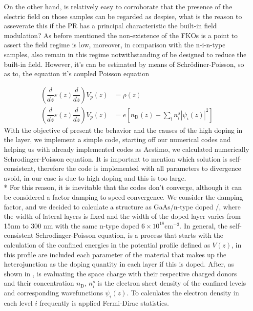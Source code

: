 On the other hand, is relatively easy to corroborate that the presence of the electric field on those samples can be regarded as despise, what is the reason to asseverate this if the PR has a principal characteristic the built-in field modulation?
As before mentioned the non-existence of the FKOs is a point to assert the field regime is low, moreover, in comparison with the n-i-n-type samples, also remain in this regime notwithstanding of be designed to reduce the built-in field. However, it's can be estimated by means of Schr\"odiner-Poisson, so as to, the equation  it's coupled Poisson equation\cite{jirauschek2014modeling,harrison2016chap3}

\begin{align}
	\left(\dfrac{d}{dz}\varepsilon(z)\dfrac{d}{dz}\right) V_{p}(z)&=\rho (z)
	\label{eq:chapter-3-poisson-equation-1}\\
	\left(\dfrac{d}{dz}\varepsilon(z)\dfrac{d}{dz}\right) V_{p}(z)&=e\left[n_{\mathrm{D}}(z)-\sum_{i}n_{i}^{s}\left|\psi_{i}(z)\right|^2\right]
	\label{eq:chapter-3-poisson-equation-2}
\end{align}
With the objective of present the behavior and the causes of the high doping in the \algaas layer, we implement a simple code, starting off our numerical codes and helping us with already implemented codes as Aestimo\cite{hebal2021general},  we calculated numerically Schrodinger-Poisson equation. It is important to mention which solution is self-consistent, therefore the code is implemented with all parameters to divergence avoid,  in our case is due to high doping and this is too large.\\*
For this reason, it is inevitable that the codes don't converge, although it can be considered a factor damping to speed convergence\cite{ram2004theschrodinger}.
We consider the damping factor, and we decided to calculate a structure as GaAs/n-type doped \algaas/\algaas, where the width of lateral layers is fixed and the width of the doped layer varies from 15nm to 300 nm with the same n-type doped $6\times 10^{18} \mathrm{cm^{-3}}$.
In general, the self-consistent Schrodinger-Poisson equation, is a process that starts with the calculation of the confined energies in the potential profile defined as $V(z)$,  in this profile are included each parameter of the material that makes up the heterojunction as the doping quantity in each layer if this is doped. After, as shown in , is evaluating the space charge with their respective charged donors and their concentration $n_{\mathrm{D}}$,  $n_{i}^{s}$ is the electron sheet density of the confined levels and corresponding wavefunctions $\psi_{i}(z)$. To  calculates the electron density in each level $i$ frequently is applied Fermi-Dirac statistics\cite{cassan2000onthereduction,ando1987calculation,bastard1990wave}. 

